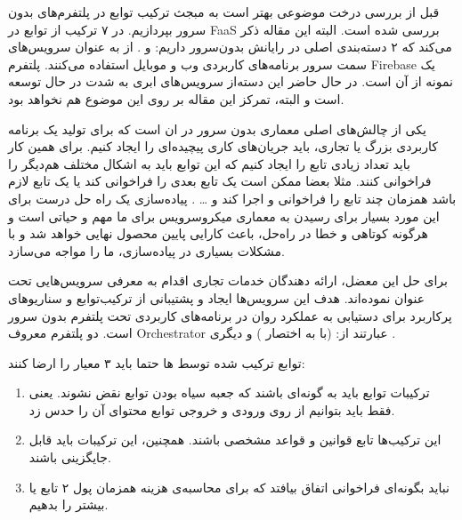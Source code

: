\label{related-works}


قبل از بررسی درخت موضوعی بهتر است به مبجث ترکیب توابع در پلتفرم‌های بدون سرور بپردازیم. در \cite{bharti2021sequential} ۷ ترکیب  از توابع در FaaS بررسی شده است. البته این مقاله ذکر می‌کند که ۲ دسته‌بندی اصلی در رایانش بدون‌سرور داریم:  و . از  به عنوان سرویس‌های سمت سرور برنامه‌های کاربردی وب و موبایل استفاده می‌کنند. پلتفرم Firebase یک نمونه از آن است. در حال حاضر این دسته‌از سرویس‌های ابری به شدت در حال توسعه است و البته، تمرکز این مقاله بر روی این موضوع هم نخواهد بود. 

یکی از چالش‌های اصلی معماری بدون سرور در ان است که برای تولید یک برنامه کاربردی بزرگ یا تجاری، باید جریان‌های کاری پیچیده‌ای را ایجاد کنیم. برای همین کار باید تعداد زیادی تابع را ایجاد کنیم که این توابع باید به اشکال مختلف هم‌دیگر را فراخوانی کنند. مثلا بعضا ممکن است یک تابع بعدی را فراخوانی کند یا یک تابع لازم باشد همزمان چند تابع را فراخوانی و اجرا کند و … . پیاده‌سازی یک راه حل درست برای این مورد بسیار برای رسیدن به معماری میکروسرویس برای ما مهم و حیاتی است و هرگونه کوتاهی و خطا در راه‌حل، باعث کارایی پایین محصول نهایی خواهد شد و با مشکلات بسیاری در پیاده‌سازی، ما را مواجه می‌سازد. 

برای حل این معضل، ارائه دهندگان خدمات تجاری اقدام به معرفی سرویس‌هایی تحت عنوان  نموده‌اند. هدف این سرویس‌ها ایجاد و پشتیبانی از ترکیب‌توابع و سناریو‌های پر‌کاربرد برای دستیابی به عملکرد روان در برنامه‌های کاربردی تحت پلتفرم بدون سرور است. دو پلتفرم معروف Orchestrator عبارتند از:  (با به اختصار ) و دیگری .

توابع ترکیب شده توسط ها حتما باید ۳ معیار را ارضا کنند: 

\begin{enumerate}
	
	\item ترکیبات توابع باید به‌ گونه‌ای باشند که جعبه سیاه بودن توابع نقض نشوند. یعنی فقط باید بتوانیم از روی ورودی و خروجی توابع محتوای آن را حدس زد.
	
	\item این ترکیب‌ها تابع قوانین و قواعد مشخصی باشند. همچنین، این ترکیبات باید قابل جایگزینی باشند.
	
	\item نباید بگونه‌ای فراخوانی اتفاق بیافتد که برای محاسبه‌ی هزینه همزمان پول ۲ تابع یا بیشتر را بدهیم.
	
\end{enumerate} 

